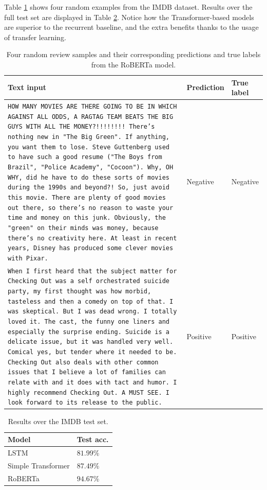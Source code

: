 Table \ref{tab:examples} shows four random examples from the IMDB dataset.
Results over the full test set are displayed in Table \ref{tab:nlp}. Notice how the Transformer-based models are superior to the recurrent baseline, and the extra benefits thanks to the usage of transfer learning.


\begin{table}[ht]
\caption{Four random review samples and their corresponding predictions and true labels from the RoBERTa model.}
\centering
\begin{tabularx}{\textwidth}{Xll}
Text input & Prediction & True label \\
\hline
 {\scriptsize \texttt{HOW MANY MOVIES ARE THERE GOING TO BE IN WHICH
AGAINST ALL ODDS, A RAGTAG TEAM BEATS THE BIG GUYS
WITH ALL THE MONEY?!!!!!!!! There's nothing new in
"The Big Green". If anything, you want them to
lose. Steve Guttenberg used to have such a good
resume ("The Boys from Brazil", "Police Academy",
"Cocoon"). Why, OH WHY, did he have to do these
sorts of movies during the 1990s and beyond?! So,
just avoid this movie. There are plenty of good
movies out there, so there's no reason to waste
your time and money on this junk. Obviously, the
"green" on their minds was money, because there's
no creativity here. At least in recent years,
Disney has produced some clever movies with Pixar.} } &   Negative & Negative   \\
\hline
 {\scriptsize \texttt{When I first heard that the subject matter for
Checking Out was a self orchestrated suicide
party, my first thought was how morbid, tasteless
and then a comedy on top of that. I was skeptical.
But I was dead wrong. I totally loved it. The
cast, the funny one liners and especially the
surprise ending. Suicide is a delicate issue, but
it was handled very well. Comical yes, but tender
where it needed to be. Checking Out also deals
with other common issues that I believe a lot of
families can relate with and it does with tact and
humor. I highly recommend Checking Out. A MUST
SEE. I look forward to its release to the public.} } &   Positive & Positive   \\

\end{tabularx}
\label{tab:examples}
\end{table}

\begin{table}[h]
\caption{Results over the IMDB test set.}
\centering
\begin{tabular}{ll}
Model & Test acc. \\
\hline
LSTM &  $81.99\%$ \\
Simple Transformer &  $87.49\%$ \\
RoBERTa &  $94.67\%$\\
\end{tabular}
\label{tab:nlp}
\end{table}











